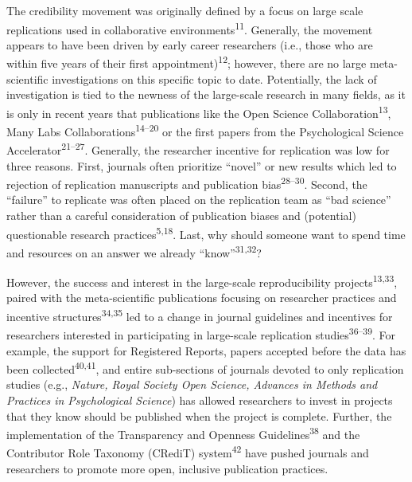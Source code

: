 \documentclass[
  man,floatsintext]{apa6}
\begin{document}
The credibility movement was originally defined by a focus on large
scale replications used in collaborative environments\textsuperscript{11}.
Generally, the movement appears to have been driven by early career
researchers (i.e., those who are within five years of their first
appointment)\textsuperscript{12}; however, there are no large meta-scientific
investigations on this specific topic to date. Potentially, the lack of
investigation is tied to the newness of the large-scale research in many
fields, as it is only in recent years that publications like the Open
Science Collaboration\textsuperscript{13}, Many Labs
Collaborations\textsuperscript{14--20} or the first papers from the
Psychological Science Accelerator\textsuperscript{21--27}. Generally, the researcher incentive for
replication was low for three reasons. First, journals often prioritize
``novel'' or new results which led to rejection of replication manuscripts
and publication bias\textsuperscript{28--30}. Second,
the ``failure'' to replicate was often placed on the replication team as
``bad science'' rather than a careful consideration of publication biases
and (potential) questionable research practices\textsuperscript{5,18}. Last, why should someone want to spend time and resources
on an answer we already ``know''\textsuperscript{31,32}?

However, the success and interest in the large-scale reproducibility
projects\textsuperscript{13,33}, paired
with the meta-scientific publications focusing on researcher practices
and incentive structures\textsuperscript{34,35} led to a
change in journal guidelines and incentives for researchers interested
in participating in large-scale replication studies\textsuperscript{36--39}. For example, the support
for Registered Reports, papers accepted before the data has been
collected\textsuperscript{40,41}, and entire sub-sections of
journals devoted to only replication studies (e.g., \emph{Nature, Royal
Society Open Science, Advances in Methods and Practices in Psychological
Science}) has allowed researchers to invest in projects that they know
should be published when the project is complete. Further, the
implementation of the Transparency and Openness Guidelines\textsuperscript{38}
and the Contributor Role Taxonomy (CRediT) system\textsuperscript{42} have
pushed journals and researchers to promote more open, inclusive
publication practices.
\end{document}
